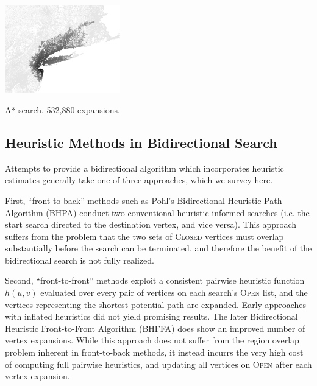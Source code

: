 \begin{marginfigure}%
   \centering%
   \includegraphics[width=5cm]{figs/incbi-road-ne/singleshot/example-astar.png}%
   \caption{A* search.
      532,880 expansions.}%
   \label{fig:ibid:example-astar}%
\end{marginfigure}

\subsection{Heuristic Methods in Bidirectional Search}
\label{subsec:ibid:heuristic-bidirectional}

Attempts to provide a bidirectional algorithm which incorporates
heuristic estimates generally take one of three approaches,
which we survey here.

First,
``front-to-back'' methods
such as Pohl's Bidirectional Heuristic Path Algorithm (BHPA)
\citep{pohl1971bidirectional}
conduct two conventional heuristic-informed searches
(i.e. the start search directed to the destination vertex,
and vice versa).
This approach suffers from the problem that the two sets of
\textsc{Closed} vertices must overlap substantially
before the search can be terminated,
and therefore the benefit of the bidirectional search
is not fully realized.

Second,
``front-to-front'' methods exploit a consistent pairwise
heuristic function $h(u,v)$ evaluated over every pair of vertices
on each search's \textsc{Open} list,
and the vertices representing the shortest potential path are
expanded.
Early approaches with inflated heuristics
\citep{doran1966doubletree} did not yield promising results.
The later Bidirectional Heuristic Front-to-Front Algorithm
(BHFFA) \citep{champeaux1983biheuragain} does show an improved
number of vertex expansions.
While this approach does not suffer from the region overlap problem
inherent in front-to-back methods,
it instead incurrs the very high cost of computing full pairwise
heuristics, and updating all vertices on \textsc{Open}
after each vertex expansion.

